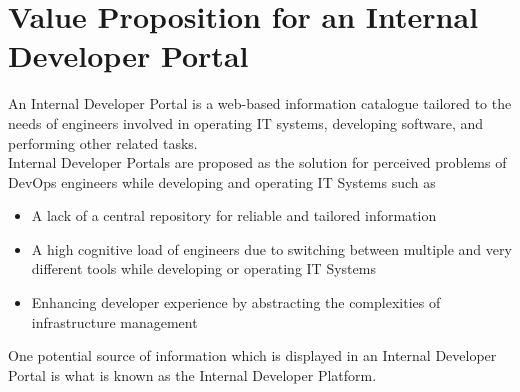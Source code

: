 \documentclass[a4paper,10pt]{article}
\begin{document}
    \section{Value Proposition for an Internal Developer Portal}
    \label{sec:vp}
    An Internal Developer Portal is a web-based information catalogue tailored to the needs of engineers involved in
    operating IT systems, developing software, and performing other related tasks.\\
    Internal Developer Portals are proposed as the solution for perceived problems\parencite{backstagestory} of DevOps
    engineers while developing and operating IT Systems such as
    \begin{itemize}
        \item A lack of a central repository for reliable and tailored information
        \item A high cognitive load of engineers due to switching between multiple and very different tools while developing or operating IT Systems
        \item Enhancing developer experience by abstracting the complexities of infrastructure management
    \end{itemize}
    One potential source of information which is displayed in an Internal Developer Portal is what is known as the Internal Developer Platform.
\end{document}
